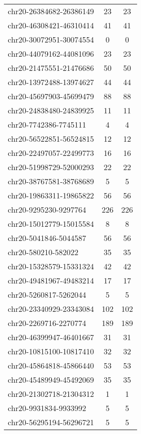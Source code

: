 \documentclass[10pt,letterpaper]{article}
\begin{document}
{\begin{longtable}{lSS}
	chr20-26384682-26386149 & 23     & 23       \\
	chr20-46308421-46310414 & 41     & 41       \\
	chr20-30072951-30074554 & 0      & 0        \\
	chr20-44079162-44081096 & 23     & 23       \\
	chr20-21475551-21476686 & 50     & 50       \\
	chr20-13972488-13974627 & 44     & 44       \\
	chr20-45697903-45699479 & 88     & 88       \\
	chr20-24838480-24839925 & 11     & 11       \\
	chr20-7742386-7745111   & 4      & 4        \\
	chr20-56522851-56524815 & 12     & 12       \\
	chr20-22497057-22499773 & 16     & 16       \\
	chr20-51998729-52000293 & 22     & 22       \\
	chr20-38767581-38768689 & 5      & 5        \\
	chr20-19863311-19865822 & 56     & 56       \\
	chr20-9295230-9297764   & 226    & 226      \\
	chr20-15012779-15015584 & 8      & 8        \\
	chr20-5041846-5044587   & 56     & 56       \\
	chr20-580210-582022     & 35     & 35       \\
	chr20-15328579-15331324 & 42     & 42       \\
	chr20-49481967-49483214 & 17     & 17       \\
	chr20-5260817-5262044   & 5      & 5        \\
	chr20-23340929-23343084 & 102    & 102      \\
	chr20-2269716-2270774   & 189    & 189      \\
	chr20-46399947-46401667 & 31     & 31       \\
	chr20-10815100-10817410 & 32     & 32       \\
	chr20-45864818-45866440 & 53     & 53       \\
	chr20-45489949-45492069 & 35     & 35       \\
	chr20-21302718-21304312 & 1      & 1        \\
	chr20-9931834-9933992   & 5      & 5        \\
	chr20-56295194-56296721 & 5      & 5        \\

\end{longtable}}
\end{document}
